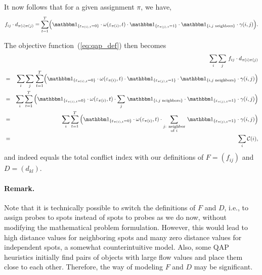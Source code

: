 It now follows that for a given assignment $\pi$, we have,
\[
f_{ij} \cdot d_{\pi(i)\pi(j)} = \sum_{t=1}^{T} \Bigl(
  \Ind{\eps_{\pi(i),t}=0}
  \cdot \omega(\eps_{\pi(i)},t)
  \cdot \Ind{\eps_{\pi(j),t}=1}
  \cdot \Ind{i,j \text{ neighbors}}
  \cdot \gamma(i,j) \Bigr).
\]

The objective function~(\ref{eq:qap_def}) then becomes
\begin{eqnarray*}
 &   & \sum_i \sum_j\, f_{ij} \cdot d_{\pi(i)\pi(j)} \\
 & = & \sum_i \sum_j\, \sum_{t=1}^{T}
                       \Bigl(
                         \Ind{\eps_{\pi(i),t}=0}
                         \cdot \omega(\eps_{\pi(i)},t)
                         \cdot \Ind{\eps_{\pi(j),t}=1}
                         \cdot \Ind{i,j \text{ neighbors}}
                         \cdot \gamma(i,j)
                       \Bigr) \\
 & = & \sum_i \sum_{t=1}^T\,
              \Bigl(
                 \Ind{\eps_{\pi(i),t}=0}
                 \cdot \omega(\eps_{\pi(i)},t)
                 \cdot \sum_j\,
                 \Ind{i,j \text{ neighbors}}
                 \cdot \Ind{\eps_{\pi(j),t}=1}
                 \cdot \gamma(i,j)
              \Bigr) \\
 & = & \sum_i \sum_{t=1}^T\,
              \Bigl(
                 \Ind{\eps_{\pi(i),t}=0}
                 \cdot \omega(\eps_{\pi(i)},t)
                 \cdot \sum_{\substack{j \text{: neighbor}\\\text{of } i}}\,
                 \Ind{\eps_{\pi(j),t}=1}
                 \cdot \gamma(i,j)
              \Bigr) \\
 & = & \sum_i \mathcal{C}(i), \\
\end{eqnarray*}
and indeed equals the total conflict index with our definitions of $F=(f_{ij})$
and $D=(d_{kl})$.

\paragraph{Remark.}
Note that it is technically possible to switch the definitions of $F$ and $D$,
i.e., to assign probes to spots instead of spots to probes as we do now, without
modifying the mathematical problem formulation. However, this would lead to high
distance values for neighboring spots and many zero distance values for
independent spots, a somewhat counterintuitive model. Also, some QAP heuristics
initially find pairs of objects with large flow values and place them close to
each other. Therefore, the way of modeling $F$ and $D$ may be significant.

